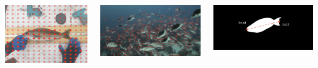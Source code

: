 \begin{frame}
\begin{columns}[T]
        \begin{column}{0.25\textwidth}
            \centering
            \includegraphics[width=\linewidth, keepaspectratio]{images/fish_grid_fsmobile.png}
        \end{column}
        
        \begin{column}{0.25\textwidth}
            \centering
            \includegraphics[width=\linewidth, keepaspectratio]{images/fishdetection.png}
        \end{column}
        
        \begin{column}{0.25\textwidth}
            \centering
            \includegraphics[width=\linewidth, keepaspectratio]{images/segmentation.png}
        \end{column}
    \end{columns}


\end{frame}
